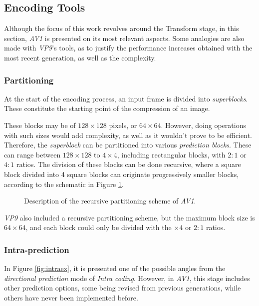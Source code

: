 \subsection{Encoding Tools}

\nocite{chenOverviewCoreCoding2018}

Although the focus of this work revolves around the Transform stage, in this section, \emph{AV1} is presented on its most relevant aspects. Some analogies are also made with \emph{VP9}'s tools, as to justify the performance increases obtained with the most recent generation, as well as the complexity.

\subsubsection{Partitioning}

At the start of the encoding process, an input frame is divided into \emph{superblocks}. These constitute the starting point of the compression of an image.

These blocks may be of $128 \times 128$ pixels, or $64 \times 64$. However, doing operations with such sizes would add complexity, as well as it wouldn't prove to be efficient. Therefore, the \emph{superblock} can be partitioned into various \emph{prediction blocks}. These can range between $128 \times 128$ to $4 \times 4$, including rectangular blocks, with $2:1$ or $4:1$ ratios. The division of these blocks can be done recursive, where a square block divided into 4 square blocks can originate progressively smaller blocks, according to the schematic in Figure \ref{fig:partitioning}.

\begin{figure}[!htbp]
    \centering
    
    \caption{Description of the recursive partitioning scheme of \emph{AV1}.} 
    \label{fig:partitioning}
\end{figure}

\emph{VP9} also included a recursive partitioning scheme, but the maximum block size is $64 \times 64$, and each block could only be divided with the $\times 4$ or $2:1$ ratios.

\subsubsection{Intra-prediction}

In Figure \ref{fig:intraex}, it is presented one of the possible angles from the \emph{directional prediction} mode of \emph{Intra coding}. However, in \emph{AV1}, this stage includes other prediction options, some being revised from previous generations, while others have never been implemented before.

